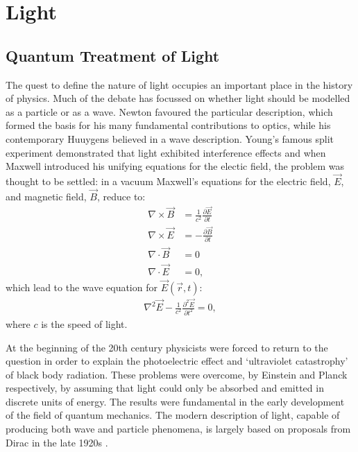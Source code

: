\chapter{Light} 
\label{ch:Light}

\section{Quantum Treatment of Light}

The quest to define the nature of light occupies an important place in the history of physics. Much of the debate has focussed on whether light should be modelled as a particle or as a wave. Newton favoured the particular description, which formed the basis for his many fundamental contributions to optics, while his contemporary Huuygens believed in a wave description. Young's famous split experiment demonstrated that light exhibited interference effects and when Maxwell introduced his unifying equations for the electic field, the problem was thought to be settled: in a vacuum Maxwell's equations for the electric field, $\vec{E}$, and magnetic field, $\vec{B}$, reduce to:
\begin{align}
  \nabla \times \vec{B} &= \frac{1}{c^2} \frac{\partial \vec{E}}{\partial t} \label{maxwell_be} \\
  \nabla \times \vec{E} &= - \frac{\partial \vec{B}}{\partial t}\\
  \nabla \cdot \vec{B} &= 0 \\
  \nabla \cdot \vec{E} &= 0,
\end{align}
which lead to the wave equation for $\vec{E}(\vec{r}, t)$:
\begin{align}\label{wave_eq}
  \nabla^2\vec{E} - \frac{1}{c^2} \frac{\partial^2 \vec{E}}{\partial t^2} = 0,
\end{align}
where $c$ is the speed of light.

At the beginning of the 20th century physicists were forced to return to the question in order to explain the photoelectric effect and `ultraviolet catastrophy' of black body radiation. These problems were overcome, by Einstein \cite{eistein_photoelectric} and Planck \cite{planck_constant} respectively, by assuming that light could only be absorbed and emitted in discrete units of energy. The results were fundamental in the early development of the field of quantum mechanics. The modern description of light, capable of producing both wave and particle phenomena, is largely based on proposals from Dirac in the late 1920s \cite{dirac_1927}.

